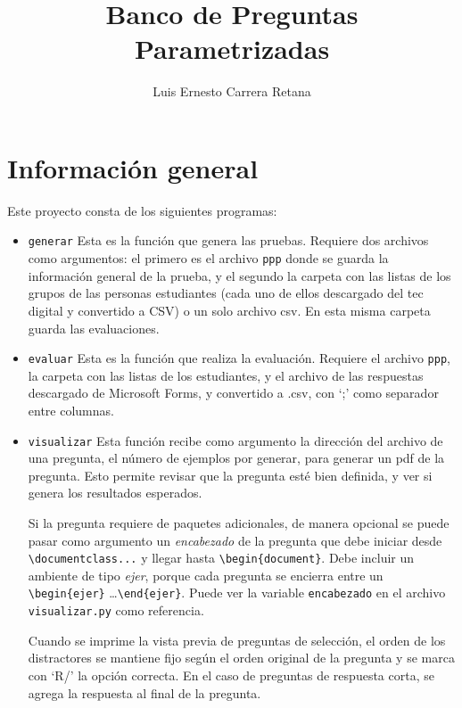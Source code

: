 \documentclass[12pt]{article}
\title{Banco de Preguntas Parametrizadas}
\author{Luis Ernesto Carrera Retana}
\theoremstyle{definition}
\begin{document}
\maketitle

\section{Información general}

Este proyecto consta de los siguientes programas:
\begin{itemize}
  \item \verb|generar| Esta es la función que genera las pruebas. Requiere dos archivos como argumentos: el primero es el archivo \verb|ppp| donde se guarda la información general de la prueba, y el segundo la carpeta con las listas de los grupos de las personas estudiantes (cada uno de ellos descargado del tec digital y convertido a CSV) o un solo archivo csv. En esta misma carpeta guarda las evaluaciones.

  \item \verb|evaluar| Esta es la función que realiza la evaluación. Requiere el archivo \verb|ppp|, la carpeta con las listas de los estudiantes, y el archivo de las respuestas descargado de Microsoft Forms, y convertido a .csv, con `;' como separador entre columnas.

  \item \verb|visualizar| Esta función recibe como argumento la dirección del archivo de una pregunta, el número de ejemplos por generar, para generar un pdf de la pregunta. Esto permite revisar que la pregunta esté bien definida, y ver si genera los resultados esperados.

    Si la pregunta requiere de paquetes adicionales, de manera opcional se puede pasar como argumento un \emph{encabezado} de la pregunta que debe iniciar desde \verb|\documentclass...| y llegar hasta \verb|\begin{document}|. Debe incluir un ambiente de tipo \emph{ejer}, porque cada pregunta se encierra entre un \verb|\begin{ejer}| \dots \verb|\end{ejer}|. Puede ver la variable \verb|encabezado| en el archivo \verb|visualizar.py| como referencia.

    Cuando se imprime la vista previa de preguntas de selección, el orden de los distractores se mantiene fijo según el orden original de la pregunta y se marca con `R/' la opción correcta. En el caso de preguntas de respuesta corta, se agrega la respuesta al final de la pregunta.
\end{itemize}
\end{document}
